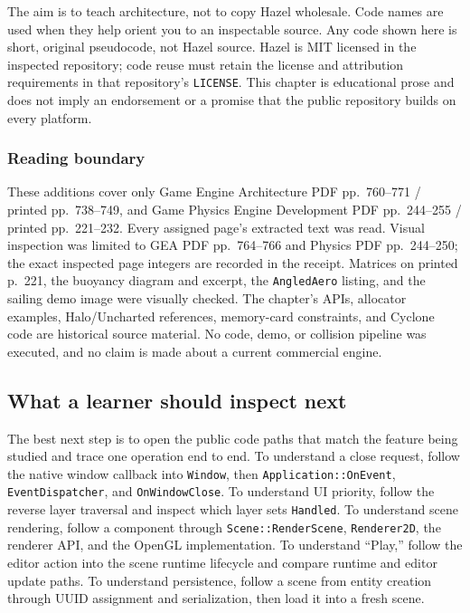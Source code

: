 The aim is to teach architecture, not to copy Hazel wholesale. Code names are used when they help orient you to an inspectable source. Any code shown here is short, original pseudocode, not Hazel source. Hazel is MIT licensed in the inspected repository; code reuse must retain the license and attribution requirements in that repository's \texttt{LICENSE}. This chapter is educational prose and does not imply an endorsement or a promise that the public repository builds on every platform.

\subsubsection{Reading boundary}\label{06-engine-ii-ch042-reading-boundary}

These additions cover only Game Engine Architecture PDF pp.~760--771 / printed pp.~738--749, and Game Physics Engine Development PDF pp.~244--255 / printed pp.~221--232. Every assigned page's extracted text was read. Visual inspection was limited to GEA PDF pp.~764--766 and Physics PDF pp.~244--250; the exact inspected page integers are recorded in the receipt. Matrices on printed p.~221, the buoyancy diagram and excerpt, the \texttt{AngledAero} listing, and the sailing demo image were visually checked. The chapter's APIs, allocator examples, Halo/Uncharted references, memory-card constraints, and Cyclone code are historical source material. No code, demo, or collision pipeline was executed, and no claim is made about a current commercial engine.

\subsection{What a learner should inspect next}\label{06-engine-ii-ch042-what-a-learner-should-inspect-next}

The best next step is to open the public code paths that match the feature being studied and trace one operation end to end. To understand a close request, follow the native window callback into \texttt{Window}, then \texttt{Application::OnEvent}, \texttt{EventDispatcher}, and \texttt{OnWindowClose}. To understand UI priority, follow the reverse layer traversal and inspect which layer sets \texttt{Handled}. To understand scene rendering, follow a component through \texttt{Scene::RenderScene}, \texttt{Renderer2D}, the renderer API, and the OpenGL implementation. To understand ``Play,'' follow the editor action into the scene runtime lifecycle and compare runtime and editor update paths. To understand persistence, follow a scene from entity creation through UUID assignment and serialization, then load it into a fresh scene.

